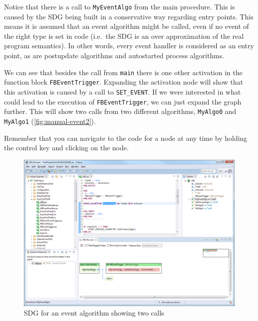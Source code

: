 Notice that there is a call to \lstinline|MyEventAlgo| from the main procedure. This is caused by the SDG being built 
in a conservative way regarding entry points. This means it is assumed that an event algorithm might be called, even if 
no event of the right type is set in code (i.e.\ the SDG is an over approximation of the real program semantics). In 
other words, every event handler is considered as an entry point, as are postupdate algorithms and autostarted process 
algorithms.

We can see that besides the call from \lstinline|main| there is one other activation in the function block 
\lstinline|FBEventTrigger|. Expanding the activation node will show that this activation is caused by a call to 
\lstinline|SET_EVENT|. If we were interested in what could lead to the execution of \lstinline|FBEventTrigger|, we can 
just expand the graph further. This will show two calls from two different algorithms, \lstinline|MyAlgo0| and 
\lstinline|MyAlgo1| (\autoref{fig:manual-event2}).

Remember that you can navigate to the code for a node at any time by holding the control key and clicking on the node.

\begin{figure}[p]
  \centering
    \includegraphics[width=\textwidth]{bilder/manual-event1}
  \caption{SDG for an event algorithm showing two calls}
  \label{fig:manual-event1}
\end{figure}


